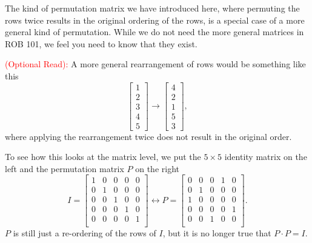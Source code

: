 The kind of permutation matrix we have introduced here, where permuting the rows twice results in the original ordering of the rows, is a special case of a more general kind of permutation. While we do not need the more general matrices in ROB 101, we feel you need to know that they exist.\\

\begin{tcolorbox}[title=\textbf{Heads Up! The above is only half the story on permutation matrices.}]
\textcolor{red}{(Optional Read):} A more general rearrangement of rows would be something like this
\begin{equation}
\label{eq:PermuationComplex}
     \left[\begin{array}{r} 1 \\2 \\3 \\ 4 \\ 5\end{array} \right] \rightarrow \left[\begin{array}{r} 4 \\2 \\1 \\ 5 \\ 3\end{array} \right],
\end{equation}
where applying the rearrangement twice does not result in the original order. 
\end{tcolorbox}

To see how this looks at the matrix level, we put the $5 \times 5$ identity matrix on the left and the permutation matrix $P$ on the right
$$
I=\begin{bmatrix}
1&0&0&0&0\\
0&1&0&0&0\\
0&0&1&0&0\\
0&0&0&1&0\\
0&0&0&0&1\\
\end{bmatrix} \leftrightarrow
P=\begin{bmatrix}
0&0&0&1&0\\
0&1&0&0&0\\
1&0&0&0&0\\
0&0&0&0&1\\
0&0&1&0&0\\
\end{bmatrix}.
$$
$P$ is still just a re-ordering of the rows of $I$, but it is no longer true that $P \cdot P = I$.\\

